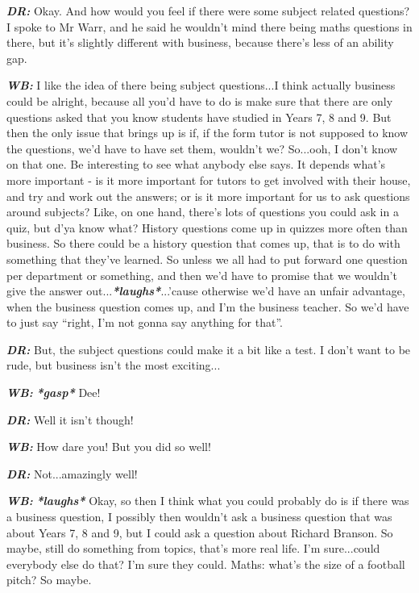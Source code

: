 \textit{\textbf{DR:}} Okay. And how would you feel if there were some subject related questions? I spoke to Mr Warr, and he said he wouldn't mind there being maths questions in there, but it's slightly different with business, because there's less of an ability gap.

\textit{\textbf{WB:}} I like the idea of there being subject questions...I think actually business could be alright, because all you'd have to do is make sure that there are only questions asked that you know students have studied in Years 7, 8 and 9. But then the only issue that brings up is if, if the form tutor is not supposed to know the questions, we'd have to have set them, wouldn't we? So...ooh, I don't know on that one. Be interesting to see what anybody else says. It depends what's more important - is it more important for tutors to get involved with their house, and try and work out the answers; or is it more important for us to ask questions around subjects? Like, on one hand, there's lots of questions you could ask in a quiz, but d'ya know what? History questions come up in quizzes more often than business. So there could be a history question that comes up, that is to do with something that they've learned. So unless we all had to put forward one question per department or something, and then we'd have to promise that we wouldn't give the answer out...\textit{\textbf{*laughs*}}...'cause otherwise we'd have an unfair advantage, when the business question comes up, and I'm the business teacher. So we'd have to just say ``right, I'm not gonna say anything for that''.

\textit{\textbf{DR:}} But, the subject questions could make it a bit like a test. I don't want to be rude, but business isn't the most exciting...

\textit{\textbf{WB:}} \textit{\textbf{*gasp*}} Dee!

\textit{\textbf{DR:}} Well it isn't though!

\textit{\textbf{WB:}} How dare you! But you did so well!

\textit{\textbf{DR:}} Not...amazingly well!

\textit{\textbf{WB:}} \textit{\textbf{*laughs*}} Okay, so then I think what you could probably do is if there was a business question, I possibly then wouldn't ask a business question that was about Years 7, 8 and 9, but I could ask a question about Richard Branson. So maybe, still do something from topics, that's more real life. I'm sure...could everybody else do that? I'm sure they could. Maths: what's the size of a football pitch? So maybe.

